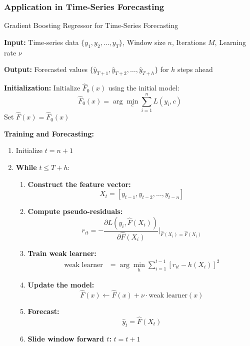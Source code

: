 \documentclass{ieeeojies}
\begin{document}
\subsubsection{Application in Time-Series Forecasting}
\begin{algorithm}[H]
    \caption{Gradient Boosting Regressor for Time-Series Forecasting}
    \label{alg:gbr-time-series}
    
    \textbf{Input:} Time-series data \( \{y_1, y_2, \ldots, y_T\} \), Window size \( n \), Iterations \( M \), Learning rate \( \nu \)
    
    \textbf{Output:} Forecasted values \( \{\hat{y}_{T+1}, \hat{y}_{T+2}, \ldots, \hat{y}_{T+h}\} \) for \( h \) steps ahead
    
    \textbf{Initialization:} Initialize \( \hat{F}_0(x) \) using the initial model:
    \[
    \hat{F}_0(x) = \arg\min_{c} \sum_{i=1}^{n} L(y_i, c)
    \]
    Set \( \hat{F}(x) = \hat{F}_0(x) \)
    
    \textbf{Training and Forecasting:}
    \begin{enumerate}
        \item Initialize \( t = n+1 \)
        \item \textbf{While} \( t \leq T+h \):
        \begin{enumerate}
            \item \textbf{Construct the feature vector:}
            \[ 
                X_t = [y_{t-1}, y_{t-2}, \ldots, y_{t-n}] 
            \]
            \item \textbf{Compute pseudo-residuals:}
                \[
                r_{it} = -\frac{\partial L(y_i, \hat{F}(X_i))}{\partial \hat{F}(X_i)} \bigg|_{\hat{F}(X_i) = \hat{F}(X_i)}
                \]
            \item \textbf{Train weak learner:}
                \[
                \begin{aligned}
                \text{weak learner} &= \arg\min_{h} \sum_{i=1}^{t-1} \left[ r_{it} - h(X_i) \right]^2
                \end{aligned}
                \]
            \item \textbf{Update the model:}
                \[
                \hat{F}(x) \leftarrow \hat{F}(x) + \nu \cdot \text{weak learner}(x)
                \]
            \item \textbf{Forecast:}
                \[
                \hat{y}_{t} = \hat{F}(X_t)
                \]
            \item \textbf{Slide window forward \( t \):} \( t = t + 1 \)
        \end{enumerate}
    \end{enumerate}
\end{algorithm}
\end{document}
